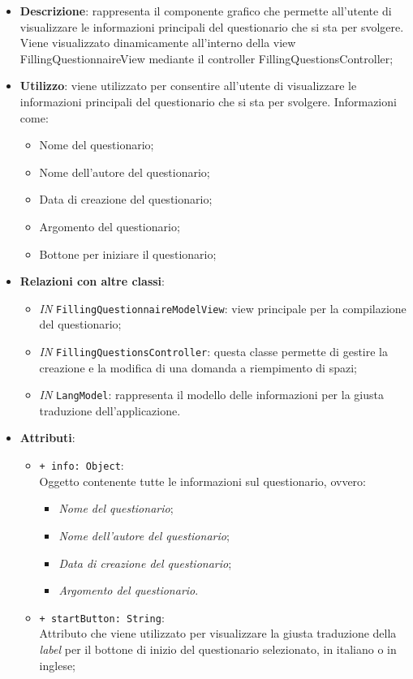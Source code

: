 		\begin{itemize}
			\item \textbf{Descrizione}: rappresenta il componente grafico che permette all'utente di visualizzare le informazioni principali del questionario che si sta per svolgere. Viene visualizzato dinamicamente all'interno della view FillingQuestionnaireView mediante il controller FillingQuestionsController;
			\item \textbf{Utilizzo}: viene utilizzato per consentire all'utente di visualizzare le informazioni principali del questionario che si sta per svolgere. Informazioni come:
			\begin{itemize}
				\item Nome del questionario;
				\item Nome dell'autore del questionario;
				\item Data di creazione del questionario;
				\item Argomento del questionario;
				\item Bottone per iniziare il questionario;
			\end{itemize}
			\item \textbf{Relazioni con altre classi}: 
			\begin{itemize}
				\item \textit{IN} \texttt{FillingQuestionnaireModelView}: view principale per la compilazione del questionario;
				\item \textit{IN} \texttt{FillingQuestionsController}: questa classe permette di gestire la creazione e la modifica di una domanda a riempimento di spazi;
				\item \textit{IN} \texttt{LangModel}: rappresenta il modello delle informazioni per la giusta traduzione dell'applicazione.
			\end{itemize}
			\item \textbf{Attributi}: 
			\begin{itemize}
				\item \texttt{+ info: Object}: \\ Oggetto contenente tutte le informazioni sul questionario, ovvero:
				\begin{itemize}
					\item \textit{Nome del questionario};
					\item \textit{Nome dell'autore del questionario};
					\item \textit{Data di creazione del questionario};
					\item \textit{Argomento del questionario}.
				\end{itemize}
				\item \texttt{+ startButton: String}: \\ Attributo che viene utilizzato per visualizzare la giusta traduzione della \textit{label} per il bottone di inizio del questionario selezionato, in italiano o in inglese; 
			\end{itemize}
		\end{itemize}
		
